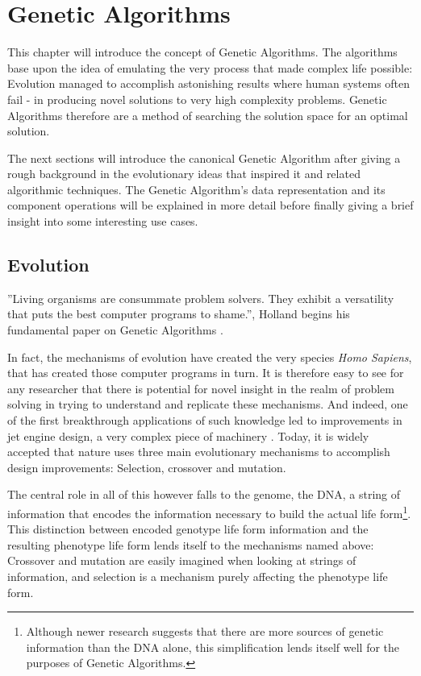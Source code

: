 \documentclass[11pt,a4paper,twoside,openright]{scrbook}
\begin{document}
\chapter{Genetic Algorithms}
This chapter will introduce the concept of Genetic Algorithms. The algorithms base upon the idea of emulating the very process that made complex life possible: Evolution managed to accomplish astonishing results where human systems often fail - in producing novel solutions to very high complexity problems. Genetic Algorithms therefore are a method of searching the solution space for an optimal solution.

The next sections will introduce the canonical Genetic Algorithm after giving a rough background in the evolutionary ideas that inspired it and related algorithmic techniques. The Genetic Algorithm's data representation and its component operations will be explained in more detail before finally giving a brief insight into some interesting use cases.

\section{Evolution}
''Living organisms are consummate problem solvers. They exhibit a versatility that puts the best computer programs to shame.'', Holland begins his fundamental paper on Genetic Algorithms \cite{Holland92}.

In fact, the mechanisms of evolution have created the very species \emph{Homo Sapiens}, that has created those computer programs in turn. It is therefore easy to see for any researcher that there is potential for novel insight in the realm of problem solving in trying to understand and replicate these mechanisms. And indeed, one of the first breakthrough applications of such knowledge led to improvements in jet engine design, a very complex piece of machinery \cite[p.\,72]{Holland92}. Today, it is widely accepted that nature uses three main evolutionary mechanisms to accomplish design improvements: Selection, crossover and mutation.

The central role in all of this however falls to the genome, the DNA, a string of information that encodes the information necessary to build the actual life form\footnote{Although newer research suggests that there are more sources of genetic information than the DNA alone, this simplification lends itself well for the purposes of Genetic Algorithms.}. This distinction between encoded genotype life form information and the resulting phenotype life form lends itself to the mechanisms named above: Crossover and mutation are easily imagined when looking at strings of information, and selection is a mechanism purely affecting the phenotype life form.
\end{document}
